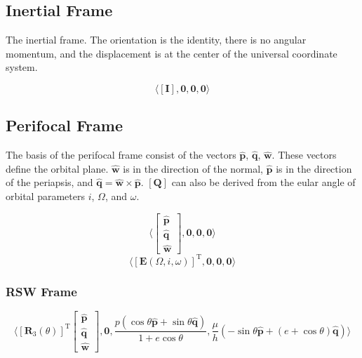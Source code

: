 \subsection{Inertial Frame}
The inertial frame. The orientation is the identity, there is no angular momentum, and the displacement is at the center of the
universal coordinate system.

\begin{equation}
    \langle \left[\mathbf{I}\right], \mathbf{0}, \mathbf{0}, \mathbf{0} \rangle
\end{equation}


\subsection{Perifocal Frame}
The basis of the perifocal frame consist of the vectors $\hat{\mathbf{p}}$, $\hat{\mathbf{q}}$, $\hat{\mathbf{w}}$. These vectors
define the orbital plane. $\hat{\mathbf{w}}$ is in the direction of the normal, $\hat{\mathbf{p}}$ is in the direction of the
periapsis, and $\hat{\mathbf{q}} = \hat{\mathbf{w}} \times \hat{\mathbf{p}}$. $\left[\mathbf{Q}\right]$ can also be derived from
the eular angle of orbital parameters $i$, $\Omega$, and $\omega$.

\begin{equation}
    \label{perifocal_pqw}
    \langle \begin{bmatrix}
        \hat{\mathbf{p}} \\
        \hat{\mathbf{q}} \\
        \hat{\mathbf{w}}
    \end{bmatrix}, \mathbf{0}, \mathbf{0}, \mathbf{0} \rangle
\end{equation}
\begin{equation}
    \label{perifocal_iWw}
    \langle \left[\mathbf{E}\left(\Omega,i,\omega\right)\right]^{\mathrm{T}}, \mathbf{0}, \mathbf{0}, \mathbf{0} \rangle
\end{equation}

\subsubsection{RSW Frame}
\begin{equation}
    \label{perifocal_rsw}
    \langle
    \left[\mathbf{R}_{3}\left(\theta\right)\right]^{\mathrm{T}}
    \begin{bmatrix}
        \hat{\mathbf{p}} \\
        \hat{\mathbf{q}} \\
        \hat{\mathbf{w}}
    \end{bmatrix},
    \mathbf{0},
    \frac{p\left(\cos{\theta}\hat{\mathbf{p}} + \sin{\theta}\hat{\mathbf{q}}\right)}{1+e\cos{\theta}},
    \frac{\mu}{h}\left(-\sin{\theta}\hat{\mathbf{p}} + \left(e+\cos{\theta}\right)\hat{\mathbf{q}}\right)
    \rangle
\end{equation}

